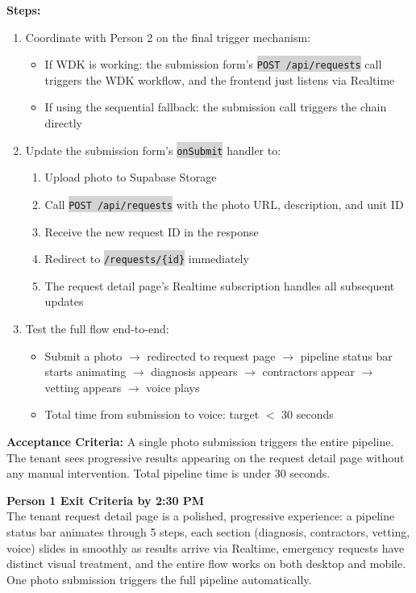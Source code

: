 \documentclass[11pt, a4paper]{article}
\newcommand{\code}[1]{\texttt{\small\colorbox{lightgray}{#1}}}
\begin{document}
\textbf{Steps:}
\begin{enumerate}[leftmargin=2em, itemsep=2pt]
  \item Coordinate with Person 2 on the final trigger mechanism:
    \begin{itemize}[itemsep=1pt]
      \item If WDK is working: the submission form's \code{POST /api/requests} call triggers the WDK workflow, and the frontend just listens via Realtime
      \item If using the sequential fallback: the submission call triggers the chain directly
    \end{itemize}

  \item Update the submission form's \code{onSubmit} handler to:
    \begin{enumerate}[itemsep=1pt]
      \item Upload photo to Supabase Storage
      \item Call \code{POST /api/requests} with the photo URL, description, and unit ID
      \item Receive the new request ID in the response
      \item Redirect to \code{/requests/\{id\}} immediately
      \item The request detail page's Realtime subscription handles all subsequent updates
    \end{enumerate}

  \item Test the full flow end-to-end:
    \begin{itemize}[itemsep=1pt]
      \item Submit a photo $\rightarrow$ redirected to request page $\rightarrow$ pipeline status bar starts animating $\rightarrow$ diagnosis appears $\rightarrow$ contractors appear $\rightarrow$ vetting appears $\rightarrow$ voice plays
      \item Total time from submission to voice: target $<$ 30 seconds
    \end{itemize}
\end{enumerate}

\textbf{Acceptance Criteria:} A single photo submission triggers the entire pipeline. The tenant sees progressive results appearing on the request detail page without any manual intervention. Total pipeline time is under 30 seconds.

\vspace{0.5em}

\begin{milestonebox}
\textbf{Person 1 Exit Criteria by 2:30 PM}\\[4pt]
The tenant request detail page is a polished, progressive experience: a pipeline status bar animates through 5 steps, each section (diagnosis, contractors, vetting, voice) slides in smoothly as results arrive via Realtime, emergency requests have distinct visual treatment, and the entire flow works on both desktop and mobile. One photo submission triggers the full pipeline automatically.
\end{milestonebox}
\end{document}
